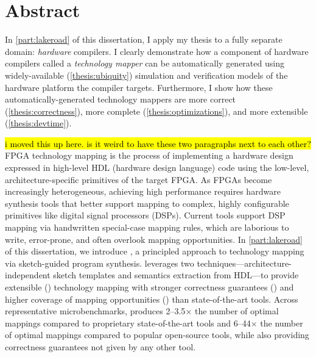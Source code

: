 \chapter*{ Abstract}

In \cref{part:lakeroad} of this dissertation,
  I apply my thesis
  to a fully separate domain:
  \textit{hardware} compilers.
I clearly demonstrate
  how a component of hardware compilers
  called a \textit{technology mapper}
  can be automatically generated
  using widely-available
  (\cref{thesis:ubiquity})
  simulation
  and verification models
  of the hardware platform
  the compiler targets.
Furthermore,
  I show how these automatically-generated
  technology mappers
  are more correct
  (\cref{thesis:correctness}),
  more complete
  (\cref{thesis:optimizations}),
  and more extensible
  (\cref{thesis:devtime}).

\hl{i moved this up here. is it weird to have these two paragraphs next to each other?}
FPGA technology mapping is the process of
  implementing a hardware design expressed in 
  high-level HDL (hardware design language) code
  using the low-level, architecture-specific primitives of 
  the target FPGA.
As FPGAs become increasingly heterogeneous, 
  achieving high performance
  requires hardware synthesis tools 
  that better support mapping to complex, 
  highly configurable primitives 
  like digital signal processors (DSPs).
Current tools
  support DSP mapping via handwritten special-case mapping rules,
  which are laborious to write, error-prone, and often overlook mapping opportunities.
In \cref{part:lakeroad} of this dissertation,
  we introduce \lr,
  a principled approach to technology mapping via
  sketch-guided program synthesis.
\lr leverages two techniques---architecture-independent 
  sketch templates and semantics extraction from HDL---to
  provide extensible ()
  technology mapping 
  with stronger correctness guarantees
  ()
  and higher coverage of 
  mapping opportunities
  ()
  than state-of-the-art tools.
Across representative microbenchmarks,
  \lr produces
  2--3.5$\times$ the number of optimal mappings
  compared to proprietary state-of-the-art tools
  and
  6--44$\times$ the number of optimal mappings
  compared to popular open-source tools,
  while also providing correctness guarantees
  not given by any other tool.